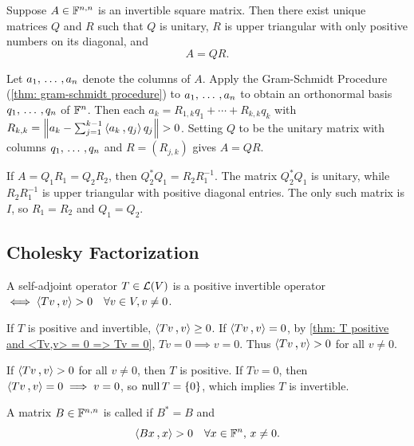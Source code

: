 \begin{thm}[QR factorization]
  \label{thm: QR factorization}
  Suppose $A \in \mathbb{F}^{n,n}$ is an invertible square matrix. Then there exist unique matrices $Q$ and $R$ such that $Q$ is unitary, $R$ is upper triangular with only positive numbers on its diagonal, and
  \begin{equation}
    A = QR.
  \end{equation}
\end{thm}
\begin{prf}
   Let $a_1, {\, \ldots \,\,}, a_n$ denote the columns of $A$. Apply the Gram-Schmidt Procedure (\ref{thm: gram-schmidt procedure}) to $a_1, {\, \ldots \,\,}, a_n$ to obtain an orthonormal basis $q_1, {\, \ldots \,\,}, q_n$ of $\mathbb{F}^n$.
  Then each $a_k = R_{1,k} q_1 + \cdots + R_{k,k} q_k$ with $R_{k,k} = \norm{a_k - \sum_{j=1}^{k-1} \ip{a_k}{q_j}q_j} > 0$.
  Setting $Q$ to be the unitary matrix with columns $q_1, {\, \ldots \,\,}, q_n$ and $R = (R_{j,k})$ gives $A = QR$.

   If $A = Q_1 R_1 = Q_2 R_2$, then $Q_2^* Q_1 = R_2 R_1^{-1}$. The matrix $Q_2^* Q_1$ is unitary, while $R_2 R_1^{-1}$ is upper triangular with positive diagonal entries. The only such matrix is $I$, so $R_1 = R_2$ and $Q_1 = Q_2$.
\end{prf}

\subsection{Cholesky Factorization}

\begin{thm}
  \label{thm: positive invertible operator}
  A self-adjoint operator $T\in \mathcal{L}(V)$ is a positive invertible operator $\iff \ip{Tv}{v} > 0 \quad \forall v \in V, v \neq 0$.
\end{thm}
\begin{prf}
  \Rightarrowdirection If $T$ is positive and invertible, $\ip{Tv}{v} \ge 0$. If $\ip{Tv}{v} = 0$, by \ref{thm: T positive and <Tv,v> = 0 => Tv = 0}, $Tv = 0 \implies v = 0$. Thus $\ip{Tv}{v} > 0$ for all $v \neq 0$.

  \Leftarrowdirection If $\ip{Tv}{v} > 0$ for all $v \neq 0$, then $T$ is positive. If $Tv = 0$, then $\ip{Tv}{v} = 0 \implies v = 0$, so $\operatorname{null} T = \{0\}$, which implies $T$ is invertible.
\end{prf}

\begin{mydef}
  A matrix $B \in \mathbb{F}^{n,n}$ is called  if $B^* = B$ and
  \begin{equation}
    \ip{Bx}{x} > 0 \quad \forall x \in \myF^n, \, x \neq 0.
  \end{equation}
\end{mydef}

